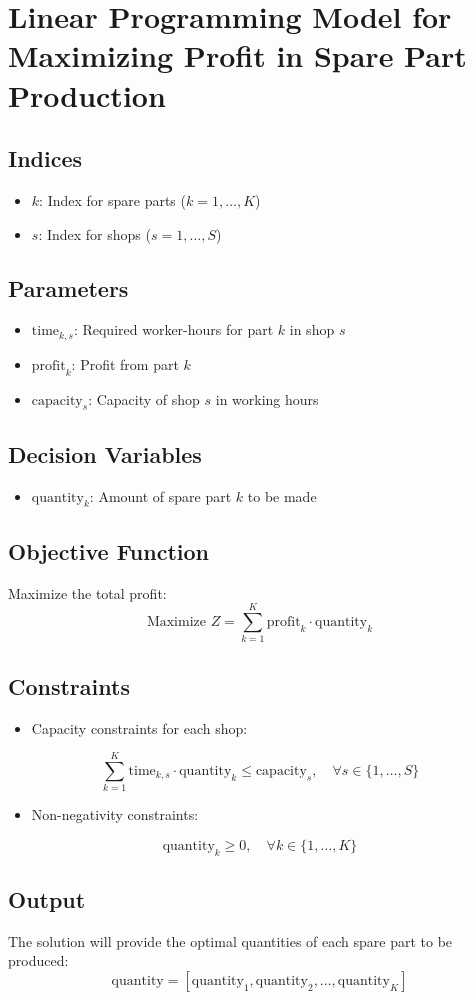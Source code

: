 \documentclass{article}
\begin{document}
\section*{Linear Programming Model for Maximizing Profit in Spare Part Production}

\subsection*{Indices}
\begin{itemize}
    \item \( k \): Index for spare parts (\( k = 1, \ldots, K \))
    \item \( s \): Index for shops (\( s = 1, \ldots, S \))
\end{itemize}

\subsection*{Parameters}
\begin{itemize}
    \item \( \text{time}_{k,s} \): Required worker-hours for part \( k \) in shop \( s \)
    \item \( \text{profit}_{k} \): Profit from part \( k \)
    \item \( \text{capacity}_{s} \): Capacity of shop \( s \) in working hours
\end{itemize}

\subsection*{Decision Variables}
\begin{itemize}
    \item \( \text{quantity}_{k} \): Amount of spare part \( k \) to be made
\end{itemize}

\subsection*{Objective Function}
Maximize the total profit:
\[
\text{Maximize } Z = \sum_{k=1}^{K} \text{profit}_{k} \cdot \text{quantity}_{k}
\]

\subsection*{Constraints}
\begin{itemize}
    \item Capacity constraints for each shop:
\end{itemize}
\[
\sum_{k=1}^{K} \text{time}_{k,s} \cdot \text{quantity}_{k} \leq \text{capacity}_{s}, \quad \forall s \in \{1, \ldots, S\}
\]
\begin{itemize}
    \item Non-negativity constraints:
\end{itemize}
\[
\text{quantity}_{k} \geq 0, \quad \forall k \in \{1, \ldots, K\}
\]

\subsection*{Output}
The solution will provide the optimal quantities of each spare part to be produced:
\[
\text{quantity} = [\text{quantity}_{1}, \text{quantity}_{2}, \ldots, \text{quantity}_{K}]
\]
\end{document}

